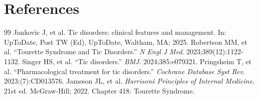 \section*{References}
\begin{thebibliography}{99}
 Jankovic J, et al. Tic disorders: clinical features and management. In: UpToDate, Post TW (Ed), UpToDate, Waltham, MA; 2025.
 Robertson MM, et al. ``Tourette Syndrome and Tic Disorders.'' \emph{N Engl J Med}. 2023;389(12):1122-1132.
 Singer HS, et al. ``Tic disorders.'' \emph{BMJ}. 2024;385:e079321.
 Pringsheim T, et al. ``Pharmacological treatment for tic disorders.'' \emph{Cochrane Database Syst Rev}. 2023;(7):CD013576.
 Jameson JL, et al. \emph{Harrison\'s Principles of Internal Medicine}. 21st ed. McGraw-Hill; 2022. Chapter 418: Tourette Syndrome.
\end{thebibliography}
